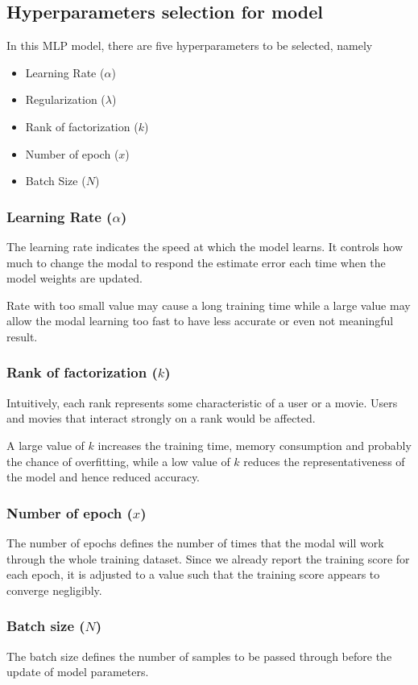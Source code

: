 \documentclass[final]{cvpr}
\begin{document}
\subsection{Hyperparameters selection for model}
In this MLP model, there are five hyperparameters to be selected, namely
\begin{itemize}
	\item Learning Rate ($\alpha$)
	\item Regularization ($\lambda$)
	\item Rank of factorization ($k$)
	\item Number of epoch ($x$)
	\item Batch Size ($N$)
\end{itemize}


\subsubsection{Learning Rate ($\alpha$)}
The learning rate indicates the speed at which the model learns. It controls how much to change the modal to respond the estimate error each time when the model weights are updated.

Rate with too small value may cause a long training time while a large value may allow the modal learning too fast to have less accurate or even not meaningful result.

\subsubsection{Rank of factorization ($k$)}
Intuitively, each rank represents some characteristic of a user or a movie. Users and movies that interact strongly on a rank would be affected.

A large value of $k$ increases the training time, memory consumption and probably the chance of overfitting,
while a low value of $k$ reduces the representativeness of the model and hence reduced accuracy.

\subsubsection{Number of epoch ($x$)}
The number of epochs defines the number of times that the modal will work through the whole training dataset.
Since we already report the training score for each epoch, it is adjusted to a value such that the training score appears to converge negligibly.

\subsubsection{Batch size ($N$)}
The batch size defines the number of samples to be passed through before the update of model parameters.
\end{document}
